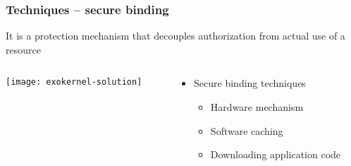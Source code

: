\begin{frame}[plain]
	\frametitle{Techniques -- secure binding}
	
	\Large
	It is a protection mechanism that decouples authorization from actual use of a resource
	
	\begin{columns}
		
		\begin{column}{.5\textwidth}
			
			\texttt{[image: exokernel-solution]}
			
		\end{column}
		
		\begin{column}{.5\textwidth}
			
		\large
		\begin{itemize}
		\item Secure binding techniques
			\begin{itemize}
				\item Hardware mechanism
				\item Software caching
				\item Downloading application code
				
			\end{itemize}	
		\end{itemize}
		\end{column}
		
		
	\end{columns}
	
\end{frame}





